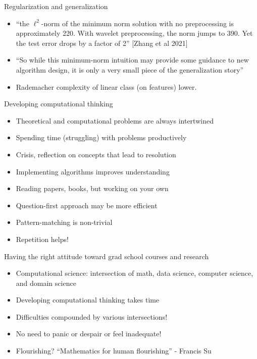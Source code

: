\documentclass[final]{beamer}
\begin{document}
\begin{frame}{Regularization and generalization}
	\begin{itemize}
	\item  ``the $\ell^2$-norm of the minimum
norm solution with no preprocessing is approximately
220. With wavelet preprocessing, the norm jumps to 390.
Yet the test error drops by a factor of 2'' [Zhang et al 2021]
	\pause
	\item ``So while this minimum-norm intuition may provide some guidance to new
algorithm design, it is only a very small piece of the generalization story''
	\pause
	\item Rademacher complexity of linear class (on features) lower. 
	
	\end{itemize}
\end{frame}
\begin{frame}{Developing computational thinking}
	\begin{itemize}
		\item Theoretical and computational problems are always intertwined
		\pause
	\item Spending time (struggling) with problems productively
		\pause
		\item Crisis, reflection on concepts that lead to resolution
		\pause
		\item Implementing algorithms improves understanding
		\pause
		\item Reading papers, books, but working on your own
		\pause
		
		\item Question-first approach may be more efficient
		\pause
		\item Pattern-matching is non-trivial
		\pause
		\item Repetition helps!
	\end{itemize}
\end{frame}
\begin{frame}{Having the right attitude toward grad school courses and research}
	\begin{itemize}
		\item Computational science: intersection of math, data science, computer science, and domain science
		\pause
		\item Developing computational thinking takes time
		\pause
		\item Difficulties compounded by various intersections!
		\pause
		\item No need to panic or despair or feel inadequate!
		\pause
		\item Flourishing? ``Mathematics for human flourishing'' - Francis Su

	\end{itemize}
\end{frame}
\end{document}
